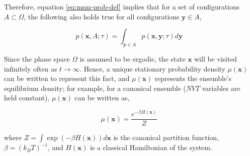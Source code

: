 \begin{spacing}{2.0}
    Therefore, equation \ref{eq:msm-prob-def} implies that for a set of configurations $A \subset \Omega$, the following also holds true for all
    configurations $\mathbf{y} \in A$,

    \begin{equation}
        p(\mathbf{x},A;\tau) = \int_{\mathbf{y}\in A}p(\mathbf{x},\mathbf{y};\tau)d\mathbf{y}
    \end{equation}

    Since the phase space $\Omega$ is assumed to be ergodic, the state $\mathbf{x}$ will be visited infinitely often as $t\to\infty$. Hence, a
    unique stationary probability density $\mu(\mathbf{x})$ can be written to represent this fact, and $\mu(\mathbf{x})$ represents the ensemble's
    equilibrium density; for example, for a canonical ensemble ($NVT$ variables are held constant), $\mu(\mathbf{x})$ can be written as,

    \begin{equation}
        \mu(\mathbf{x}) = \frac{e^{-\beta H(\mathbf{x})}}{Z}
    \end{equation}

    \noindent where $Z = \int\exp(-\beta H(\mathbf{x}))d\mathbf{x}$ is the canonical partition function, $\beta = (k_B T)^{-1}$, and $H(\mathbf{x})$
    is a classical Hamiltonian of the system.
\end{spacing}
